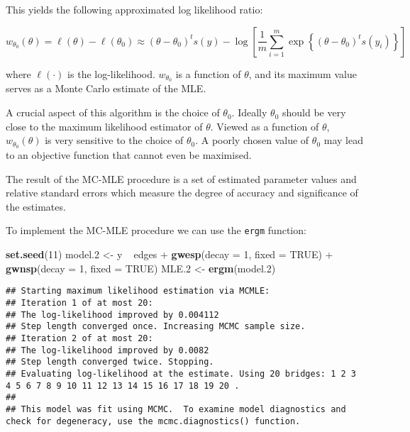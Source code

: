 \documentclass[]{book}
\newenvironment{Shaded}{\begin{snugshade}}{\end{snugshade}}
\newcommand{\KeywordTok}[1]{\textcolor[rgb]{0.13,0.29,0.53}{\textbf{{#1}}}}
\newcommand{\DataTypeTok}[1]{\textcolor[rgb]{0.13,0.29,0.53}{{#1}}}
\newcommand{\DecValTok}[1]{\textcolor[rgb]{0.00,0.00,0.81}{{#1}}}
\newcommand{\FloatTok}[1]{\textcolor[rgb]{0.00,0.00,0.81}{{#1}}}
\newcommand{\StringTok}[1]{\textcolor[rgb]{0.31,0.60,0.02}{{#1}}}
\newcommand{\OtherTok}[1]{\textcolor[rgb]{0.56,0.35,0.01}{{#1}}}
\newcommand{\NormalTok}[1]{{#1}}
\begin{document}
This yields the following approximated log likelihood ratio:

\begin{equation} 
w_{\theta_0}(\theta)=\ell(\theta)-\ell(\theta_0) \approx (\theta - \theta_0)^t s(y) - 
\log\left[ \frac{1}{m}\sum_{i=1}^m \exp\left\{ (\theta-\theta_0)^t s(y_i) \right\} \right] 
\label{eqn:gey:thom}
\end{equation}

where \(\ell(\cdot)\) is the log-likelihood. \(w_{\theta_0}\) is a
function of \(\theta\), and its maximum value serves as a Monte Carlo
estimate of the MLE.

A crucial aspect of this algorithm is the choice of \(\theta_0\).
Ideally \(\theta_0\) should be very close to the maximum likelihood
estimator of \(\theta\). Viewed as a function of \(\theta\),
\(w_{\theta_0}(\theta)\) is very sensitive to the choice of
\(\theta_0\). A poorly chosen value of \(\theta_0\) may lead to an
objective function that cannot even be maximised.

The result of the MC-MLE procedure is a set of estimated parameter
values and relative standard errors which measure the degree of accuracy
and significance of the estimates.

To implement the MC-MLE procedure we can use the \texttt{ergm} function:

\begin{Shaded}
\begin{Highlighting}[]
\KeywordTok{set.seed}\NormalTok{(}\DecValTok{11}\NormalTok{)}
\NormalTok{model}\FloatTok{.2} \NormalTok{<-}\StringTok{ }\NormalTok{y ~}\StringTok{ }\NormalTok{edges +}\StringTok{ }
\StringTok{               }\KeywordTok{gwesp}\NormalTok{(}\DataTypeTok{decay =} \DecValTok{1}\NormalTok{, }\DataTypeTok{fixed =} \OtherTok{TRUE}\NormalTok{) +}\StringTok{ }
\StringTok{               }\KeywordTok{gwnsp}\NormalTok{(}\DataTypeTok{decay =} \DecValTok{1}\NormalTok{, }\DataTypeTok{fixed =} \OtherTok{TRUE}\NormalTok{)}
\NormalTok{MLE}\FloatTok{.2} \NormalTok{<-}\StringTok{ }\KeywordTok{ergm}\NormalTok{(model}\FloatTok{.2}\NormalTok{)}
\end{Highlighting}
\end{Shaded}

\begin{verbatim}
## Starting maximum likelihood estimation via MCMLE:
## Iteration 1 of at most 20: 
## The log-likelihood improved by 0.004112 
## Step length converged once. Increasing MCMC sample size.
## Iteration 2 of at most 20: 
## The log-likelihood improved by 0.0082 
## Step length converged twice. Stopping.
## Evaluating log-likelihood at the estimate. Using 20 bridges: 1 2 3 4 5 6 7 8 9 10 11 12 13 14 15 16 17 18 19 20 .
## 
## This model was fit using MCMC.  To examine model diagnostics and check for degeneracy, use the mcmc.diagnostics() function.
\end{verbatim}
\end{document}
